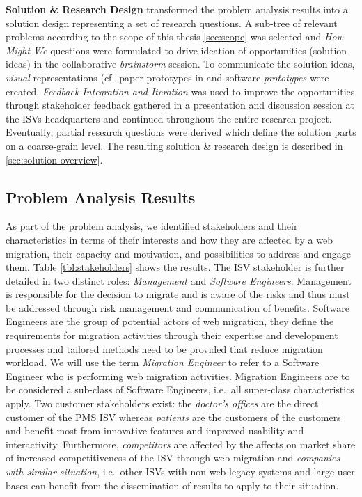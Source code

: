 \textbf{Solution \& Research Design} transformed the problem analysis results into a solution design representing a set of research questions.
A sub-tree of relevant problems according to the scope of this thesis \cref{sec:scope} was selected and \emph{How Might We} questions were formulated to drive ideation of opportunities (solution ideas) in the collaborative \emph{brainstorm} session.
To communicate the solution ideas, \emph{visual} representations (cf.~paper prototypes in  and software \emph{prototypes} were created.
\emph{Feedback Integration and Iteration} was used to improve the opportunities through stakeholder feedback gathered in a presentation and discussion session at the ISVs headquarters and continued throughout the entire research project.
Eventually, partial research questions were derived which define the solution parts on a coarse-grain level.
The resulting solution \& research design is described in \cref{sec:solution-overview}.

\hypertarget{sec:problem-analysis-results}{%
\subsection{Problem Analysis Results}\label{sec:problem-analysis-results}}

As part of the problem analysis, we identified stakeholders and their characteristics in terms of their interests and how they are affected by a web migration, their capacity and motivation, and possibilities to address and engage them.
Table \cref{tbl:stakeholders} shows the results.
The ISV stakeholder is further detailed in two distinct roles: \emph{Management} and \emph{Software Engineers}.
Management is responsible for the decision to migrate and is aware of the risks and thus must be addressed through risk management and communication of benefits.
Software Engineers are the group of potential actors of web migration, they define the requirements for migration activities through their expertise and development processes and tailored methods need to be provided that reduce migration workload.
We will use the term \emph{Migration Engineer} to refer to a Software Engineer who is performing web migration activities.
Migration Engineers are to be considered a sub-class of Software Engineers, i.e.~all super-class characteristics apply.
Two customer stakeholders exist: the \emph{doctor's offices} are the direct customer of the PMS ISV whereas \emph{patients} are the customers of the customers and benefit most from innovative features and improved usability and interactivity.
Furthermore, \emph{competitors} are affected by the affects on market share of increased competitiveness of the ISV through web migration and \emph{companies with similar situation}, i.e.~other ISVs with non-web legacy systems and large user bases can benefit from the dissemination of results to apply to their situation.


